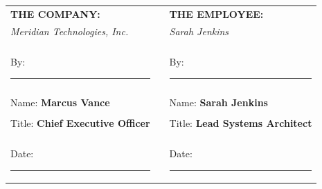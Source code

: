 \documentclass[11pt,a4paper]{article}
\begin{document}
\noindent
\begin{tabularx}{\linewidth}{X p{0.5in} X}
    \textbf{THE COMPANY:} & & \textbf{THE EMPLOYEE:} \\
    \textit{Meridian Technologies, Inc.} & & \textit{Sarah Jenkins} \\
    & & \\
    By: \rule{2.2in}{0.5pt} & & By: \rule{2.2in}{0.5pt} \\
    & & \\
    Name: \textbf{Marcus Vance} & & Name: \textbf{Sarah Jenkins} \\
    & & \\
    Title: \textbf{Chief Executive Officer} & & Title: \textbf{Lead Systems Architect} \\
    & & \\
    Date: \rule{2.2in}{0.5pt} & & Date: \rule{2.2in}{0.5pt}
\end{tabularx}
\end{document}
